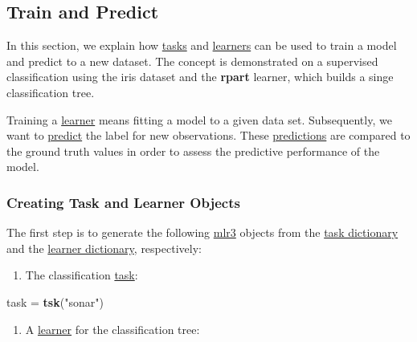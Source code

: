 \documentclass[]{article}
\newenvironment{Shaded}{\begin{snugshade}}{\end{snugshade}}
\newcommand{\KeywordTok}[1]{\textcolor[rgb]{0.13,0.29,0.53}{\textbf{#1}}}
\newcommand{\NormalTok}[1]{#1}
\newcommand{\StringTok}[1]{\textcolor[rgb]{0.31,0.60,0.02}{#1}}
\providecommand{\tightlist}{%
  \setlength{\itemsep}{0pt}\setlength{\parskip}{0pt}}
\renewenvironment{Shaded} {\begin{snugshade}\small} {\end{snugshade}}
\begin{document}
\hypertarget{train-predict}{%
\subsection{Train and Predict}\label{train-predict}}

In this section, we explain how \protect\hyperlink{tasks}{tasks} and \protect\hyperlink{learners}{learners} can be used to train a model and predict to a new dataset.
The concept is demonstrated on a supervised classification using the iris dataset and the \textbf{rpart} learner, which builds a singe classification tree.

Training a \protect\hyperlink{learners}{learner} means fitting a model to a given data set.
Subsequently, we want to \protect\hyperlink{predicting}{predict} the label for new observations.
These \protect\hyperlink{predicting}{predictions} are compared to the ground truth values in order to assess the predictive performance of the model.

\hypertarget{train-predict-objects}{%
\subsubsection{Creating Task and Learner Objects}\label{train-predict-objects}}

The first step is to generate the following \href{https://mlr3.mlr-org.com}{mlr3} objects from the \protect\hyperlink{tasks}{task dictionary} and the \protect\hyperlink{learners}{learner dictionary}, respectively:

\begin{enumerate}
\def\labelenumi{\arabic{enumi}.}
\tightlist
\item
  The classification \protect\hyperlink{tasks}{task}:
\end{enumerate}

\begin{Shaded}
\begin{Highlighting}[]
\NormalTok{task =}\StringTok{ }\KeywordTok{tsk}\NormalTok{(}\StringTok{"sonar"}\NormalTok{)}
\end{Highlighting}
\end{Shaded}

\begin{enumerate}
\def\labelenumi{\arabic{enumi}.}
\setcounter{enumi}{1}
\tightlist
\item
  A \protect\hyperlink{learners}{learner} for the classification tree:
\end{enumerate}
\end{document}
